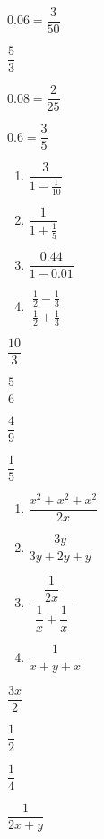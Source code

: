 \documentclass[11pt]{article}
\begin{document}
\begin{multicols}{4}
\color{blue}
\begin{description}
\item \center $0.06 = \dfrac{3}{50}$
\item \center $\dfrac{5}{3}$
\item \center $0.08 = \dfrac{2}{25}$
\item \center $0.6 = \dfrac{3}{5}$
\setcounter{enumCount}{\theenumi}
\end{description}
\end{multicols}
\vfill

\begin{multicols}{4}
\begin{enumerate}
\setcounter{enumi}{\theenumCount}
\item $\dfrac{3}{1-\tfrac{1}{10}}$
\item $\dfrac{1}{1+\tfrac{1}{5}}$
\item $\dfrac{0.44}{1-0.01}$
\item $\dfrac{~\frac{1}{2}-\frac{1}{3}~}{\frac{1}{2} + \frac{1}{3}}$
\setcounter{enumCount}{\theenumi}
\end{enumerate}
\end{multicols}

\begin{multicols}{4}
\color{blue}
\begin{description}
\item \center $\dfrac{10}{3}$
\item \center $\dfrac{5}{6}$
\item \center $\dfrac{4}{9}$
\item \center $\dfrac{1}{5}$
\setcounter{enumCount}{\theenumi}
\end{description}
\end{multicols}
\vfill


\begin{multicols}{4}
\begin{enumerate}
\setcounter{enumi}{\theenumCount}
\item $\dfrac{x^2+x^2+x^2}{2x}$
\item $\dfrac{3y}{3y+2y+y}$
\item $\dfrac{~~\dfrac{1}{2x}~~}{~~\dfrac{1}{x}+\dfrac{1}{x}~~}$
\item $\dfrac{1}{x+y+x}$
\setcounter{enumCount}{\theenumi}
\end{enumerate}
\end{multicols}

\begin{multicols}{4}
\color{blue}
\begin{description}
\item \center $\dfrac{3x}{2}$
\item \center $\dfrac{1}{2}$
\item \center $\dfrac{1}{4}$
\item \center $\dfrac{1}{2x+y}$
\setcounter{enumCount}{\theenumi}
\end{description}
\end{multicols}
\vfill
\end{document}
